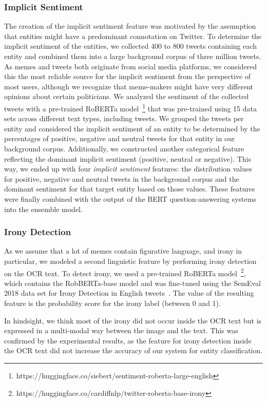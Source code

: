 \documentclass[11pt]{article}
\begin{document}
\subsubsection{Implicit Sentiment}
The creation of the implicit sentiment feature was motivated by the assumption that entities might have a predominant connotation on Twitter.
To determine the implicit sentiment of the entities, we collected 400 to 800 tweets containing each entity and combined them into a large background corpus of three million tweets. As memes and tweets both originate from social media platforms, we considered this the most reliable source for the implicit sentiment from the perspective of most users, although we recognize that meme-makers might have very different opinions about certain politicians.
We analyzed the sentiment of the collected tweets with a pre-trained RoBERTa model~\cite{heitmann2020}\footnote{https://huggingface.co/siebert/sentiment-roberta-large-english} that was pre-trained using 15 data sets across different text types, including tweets.
We grouped the tweets per entity and considered the implicit sentiment of an entity to be determined by the percentages of positive, negative and neutral tweets for that entity in our background corpus.
Additionally, we constructed another categorical feature reflecting the dominant implicit sentiment (positive, neutral or negative).
This way, we ended up with four \emph{implicit sentiment} features: the distribution values for positive, negative and neutral tweets in the background corpus and the dominant sentiment for that target entity based on those values.
These features were finally combined with the output of the BERT question-answering systems into the ensemble model.

\subsubsection{Irony Detection}
As we assume that a lot of memes contain figurative language, and irony in particular, we modeled a second linguistic feature by performing irony detection on the OCR text.
To detect irony, we used a pre-trained RoBERTa model~\cite{barbieri2020tweeteval}\footnote{https://huggingface.co/cardiffnlp/twitter-roberta-base-irony}, which contains the RobBERTa-base model and was fine-tuned using the SemEval 2018 data set for Irony Detection in English tweets~\cite{VanHeeSemeval2018}. The value of the resulting feature is the probability score for the irony label (between 0 and 1).

In hindsight, we think most of the irony did not occur inside the OCR text but is expressed in a multi-modal way between the image and the text.
This was confirmed by the experimental results, as the feature for irony detection inside the OCR text did not increase the accuracy of our system for entity classification.
\end{document}

